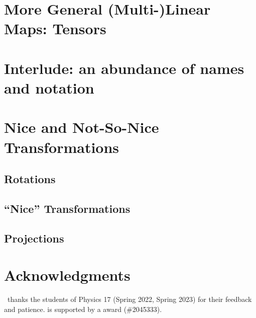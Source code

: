 \documentclass[12pt]{article}
\begin{document}
\section{More General (Multi-)Linear Maps: Tensors}


\section{Interlude: an abundance of names and notation}

\section{Nice and Not-So-Nice Transformations}

\subsection{Rotations}

\subsection{``Nice'' Transformations}


\subsection{Projections}

\section*{Acknowledgments}

\ thanks the students of Physics 17 (Spring 2022, Spring 2023) for their feedback and patience.
%
 is supported by a  award (\#2045333).



% 
\end{document}
